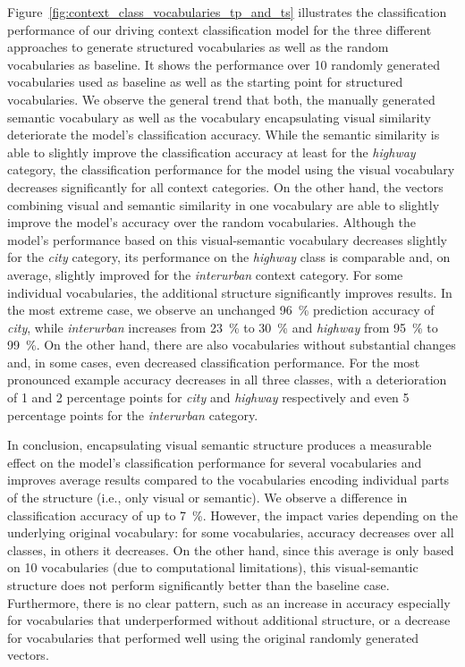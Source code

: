 Figure~\ref{fig:context_class_vocabularies_tp_and_ts} illustrates the classification performance of our driving context classification model for the three different approaches to generate structured vocabularies as well as the random vocabularies as baseline. 
It shows the performance over \num{10} randomly generated vocabularies used as baseline as well as the starting point for structured vocabularies.
We observe the general trend that both, the manually generated semantic vocabulary as well as the vocabulary encapsulating visual similarity deteriorate the model's classification accuracy.
While the semantic similarity is able to slightly improve the classification accuracy at least for the \emph{highway} category, the classification performance for the model using the visual vocabulary decreases significantly for all context categories.
On the other hand, the vectors combining visual and semantic similarity in one vocabulary are able to slightly improve the model's accuracy over the random vocabularies.
Although the model's performance based on this visual-semantic vocabulary decreases slightly for the \emph{city} category, its performance on the \emph{highway} class is comparable and, on average, slightly improved for the \emph{interurban} context category.
For some individual vocabularies, the additional structure significantly improves results.
In the most extreme case, we observe an unchanged \SI{96}{\percent} prediction accuracy of \emph{city}, while \emph{interurban} increases from \SI{23}{\percent} to \SI{30}{\percent} and \emph{highway} from \SI{95}{\percent} to \SI{99}{\percent}. 
On the other hand, there are also vocabularies without substantial changes and, in some cases, even decreased classification performance.
For the most pronounced example accuracy decreases in all three classes, with a deterioration of \num{1} and \num{2} percentage points for \emph{city} and \emph{highway} respectively and even \num{5} percentage points for the \emph{interurban} category.

In conclusion, encapsulating visual semantic structure produces a measurable effect on the model's classification performance for several vocabularies and improves average results compared to the vocabularies encoding individual parts of the structure (i.e., only visual or semantic).
We observe a difference in classification accuracy of up to \SI{7}{\percent}.
However, the impact varies depending on the underlying original vocabulary: for some vocabularies, accuracy decreases over all classes, in others it decreases.
On the other hand, since this average is only based on \num{10} vocabularies (due to computational limitations), this visual-semantic structure does not perform significantly better than the baseline case.
Furthermore, there is no  clear pattern, such as an increase in accuracy especially for vocabularies that underperformed without additional structure, or a decrease for vocabularies that performed well using the original randomly generated vectors.


